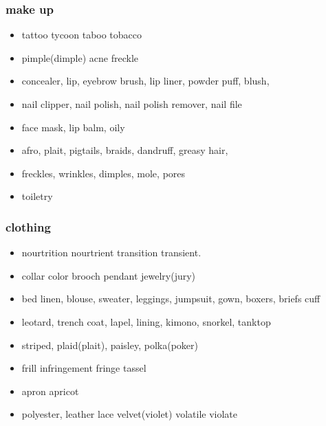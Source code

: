 \documentclass[a4paper,11pt,twoside]{book}
\begin{document}
\subsubsection{make up}
\begin{itemize}
\item tattoo tycoon taboo tobacco 

\item pimple(dimple) acne freckle

\item concealer, lip, eyebrow brush, lip liner, powder puff, blush, 

\item nail clipper, nail polish, nail polish remover, nail file

\item face mask, lip balm, oily  

\item afro, plait, pigtails, braids, dandruff, greasy hair, 

\item freckles, wrinkles, dimples, mole, pores

\item toiletry
\end{itemize}

\subsubsection{clothing}
\begin{itemize}
	\item nourtrition nourtrient transition transient. 

   \item collar color brooch pendant jewelry(jury)
	
   \item bed linen, blouse, sweater, leggings, jumpsuit, gown, boxers, briefs cuff
	
   \item leotard, trench coat, lapel, lining, kimono, snorkel, tanktop 

   \item striped, plaid(plait), paisley, polka(poker)

	\item frill infringement fringe tassel
	
	\item apron apricot
	
	\item polyester, leather lace velvet(violet) volatile violate
	 
\end{itemize}
\end{document}
